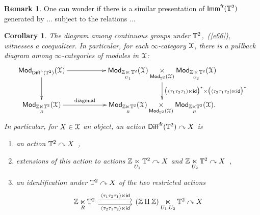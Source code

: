 \documentclass{amsart}
\newtheorem{cor}[theorem]{Corollary}
\theoremstyle{definition}
\newtheorem{remark}[theorem]{Remark}
\theoremstyle{remark}
\DeclareMathOperator{\Mod}{\sf Mod}
\newcommand{\lacts}{\curvearrowright}
\DeclareMathOperator{\Diff}{{\sf Diff}}
\DeclareMathOperator{\fr}{\sf fr}
\newcommand{\lag}{\langle}
\newcommand{\rag}{\rangle}
\DeclareMathOperator{\id}{\sf id}
\DeclareMathOperator{\Imm}{\sf Imm}
\begin{document}
\begin{remark}
One can wonder if there is a similar presentation of $\Imm^{\sf fr}(\TT^{2})$ generated by ... subject to the relations ...
\end{remark}


\begin{cor}
\label{t49}
The diagram among continuous groups under $\mathbb T^2$,~(\ref{e66}), 
witnesses a coequalizer.
In particular, for each $\infty$-category $\mathcal X$, there is a pullback diagram among $\infty$-categories of modules in $\mathcal X$:
\[
\xymatrix{
\Mod_{\Diff^{\fr}(\TT^2)}(\cX)
\ar[rr]
\ar[d]
&&
\Mod_{\ZZ \underset{U_1} \ltimes \TT^2}(\cX)
\underset{\Mod_{\TT^2}(\cX)}\times
\Mod_{\ZZ  \underset{U_2} \ltimes \TT^2}(\cX)
\ar[d]^-{\bigl(\lag \tau_{1} \tau_{2} \tau_{1}\rag \ltimes \id \bigr)^\ast \times \bigl(\lag \tau_{2} \tau_{1} \tau_{2}\rag \ltimes \id \bigr)^\ast}
\\
\Mod_{\ZZ \underset{R} \ltimes \TT^2}(\cX)
\ar[rr]^-{\rm diagonal}
&&
\Mod_{ \ZZ \underset{R} \ltimes \TT^2}(\cX)
\underset{\Mod_{\TT^2}(\cX)}\times
\Mod_{\ZZ \underset{R} \ltimes \TT^2}(\cX)
.
}
\]
In particular, for $X\in \mathcal X$ an object, an action $\Diff^{\fr}(\TT^2) \lacts X$ is 
\begin{enumerate}
\item
an action $\TT^2\lacts X$~,

\item
extensions of this action to actions $\ZZ \underset{U_1}\ltimes \TT^2 \lacts X$ and $\ZZ \underset{U_2} \ltimes \TT^2  \lacts X$~,

\item
an identification under $\TT^2 \lacts X$ of the two restricted actions
\[
\begin{tikzcd}
\ZZ \underset{R}\ltimes \TT^2 \arrow[rr, yshift=0.7ex, "\lag \tau_{1} \tau_{2} \tau_{1}\rag \ltimes \id "] \arrow[swap, rr, yshift=-0.7ex, "\lag \tau_{2} \tau_{1} \tau_{2}\rag \ltimes \id "]
&
&
(\ZZ \amalg \ZZ) \underset{U_1, U_2}\ltimes \TT^2  \lacts X
\end{tikzcd}
\]


\end{enumerate}


\end{cor}
\end{document}
